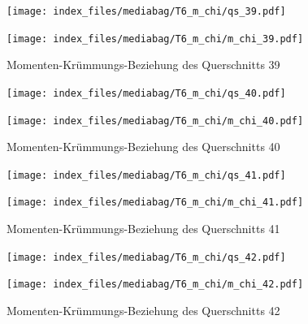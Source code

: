 \documentclass[
  11pt,
  letterpaper,
]{scrreprt}
\begin{document}
\begin{figure}[H]

\begin{minipage}{0.50\linewidth}
\texttt{[image: index\_files/mediabag/T6\_m\_chi/qs\_39.pdf]}\end{minipage}%
%
\begin{minipage}{0.50\linewidth}
\texttt{[image: index\_files/mediabag/T6\_m\_chi/m\_chi\_39.pdf]}\end{minipage}%

\caption{\label{fig-mchi_anhang}Momenten-Krümmungs-Beziehung des
Querschnitts 39}

\end{figure}%

\begin{figure}[H]

\begin{minipage}{0.50\linewidth}
\texttt{[image: index\_files/mediabag/T6\_m\_chi/qs\_40.pdf]}\end{minipage}%
%
\begin{minipage}{0.50\linewidth}
\texttt{[image: index\_files/mediabag/T6\_m\_chi/m\_chi\_40.pdf]}\end{minipage}%

\caption{\label{fig-mchi_anhang}Momenten-Krümmungs-Beziehung des
Querschnitts 40}

\end{figure}%

\begin{figure}[H]

\begin{minipage}{0.50\linewidth}
\texttt{[image: index\_files/mediabag/T6\_m\_chi/qs\_41.pdf]}\end{minipage}%
%
\begin{minipage}{0.50\linewidth}
\texttt{[image: index\_files/mediabag/T6\_m\_chi/m\_chi\_41.pdf]}\end{minipage}%

\caption{\label{fig-mchi_anhang}Momenten-Krümmungs-Beziehung des
Querschnitts 41}

\end{figure}%

\begin{figure}[H]

\begin{minipage}{0.50\linewidth}
\texttt{[image: index\_files/mediabag/T6\_m\_chi/qs\_42.pdf]}\end{minipage}%
%
\begin{minipage}{0.50\linewidth}
\texttt{[image: index\_files/mediabag/T6\_m\_chi/m\_chi\_42.pdf]}\end{minipage}%

\caption{\label{fig-mchi_anhang}Momenten-Krümmungs-Beziehung des
Querschnitts 42}

\end{figure}%
\end{document}
